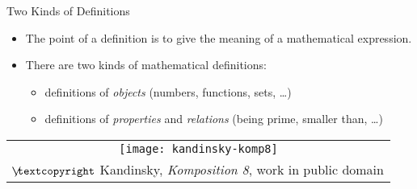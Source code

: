 \documentclass[../slides.tex]{subfiles}
\begin{document}
\begin{frame}{Two Kinds of Definitions}


	\begin{itemize}

		\item The point of a definition is to give the meaning of a mathematical expression.
		
		\item There are two kinds of mathematical definitions:
		
			\begin{itemize}
			
				\item definitions of \emph{objects} (numbers, functions, sets, \dots)
				
				\item definitions of \emph{properties} and \emph{relations} (being prime, smaller than, \dots)
			
			\end{itemize}
			
	\end{itemize}
	
	\begin{center}
		\begin{tabular}{c}
		\texttt{[image: kandinsky-komp8]}\\[-1ex]
		{\tiny $\not\hspace{-1ex}\textcopyright$ Kandinsky, \emph{Komposition 8}, work in public domain}
		\end{tabular}
		\end{center}

\end{frame}
\end{document}
